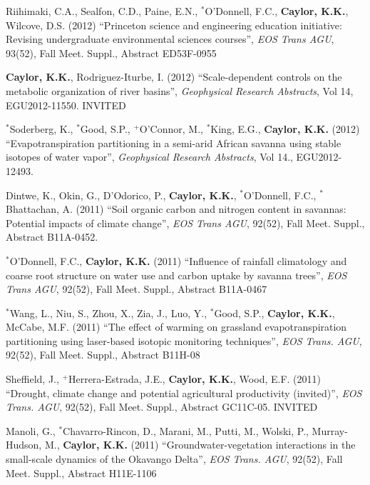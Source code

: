 \documentclass[10pt]{report}
\begin{document}
\begin{etaremune}
\item Riihimaki, C.A., Sealfon, C.D., Paine, E.N., $^{*}$O'Donnell, F.C., \textbf{Caylor, K.K.}, Wilcove, D.S. (2012) ``Princeton science and engineering education initiative: Revising undergraduate environmental sciences courses'', \emph{EOS Trans AGU}, 93(52), Fall Meet. Suppl., Abstract ED53F-0955

\item  \textbf{Caylor, K.K.}, Rodriguez-Iturbe, I. (2012) ``Scale-dependent controls on the metabolic organization of river basins'', \emph{Geophysical Research Abstracts}, Vol 14, EGU2012-11550. INVITED

\item  $^{*}$Soderberg, K., $^{*}$Good, S.P.,  $^{+}$O'Connor, M.,  $^{*}$King, E.G., \textbf{Caylor, K.K.} (2012) ``Evapotranspiration partitioning in a semi-arid African savanna using stable isotopes of water vapor'', \emph{Geophysical Research Abstracts}, Vol 14., EGU2012-12493.

\item Dintwe, K., Okin, G., D'Odorico, P., \textbf{Caylor, K.K.}, $^{*}$O'Donnell, F.C., $^{*}$Bhattachan, A. (2011) ``Soil organic carbon and nitrogen content in savannas: Potential impacts of climate change'', \emph{EOS Trans AGU}, 92(52), Fall Meet. Suppl., Abstract B11A-0452.

\item $^{*}$O'Donnell, F.C., \textbf{Caylor, K.K.} (2011) ``Influence of rainfall climatology and coarse root structure on water use and carbon uptake by savanna trees'', \emph{EOS Trans AGU}, 92(52), Fall Meet. Suppl., Abstract B11A-0467

\item  $^{*}$Wang, L., Niu, S., Zhou, X., Zia, J., Luo, Y.,  $^{*}$Good, S.P., \textbf{Caylor, K.K.}, McCabe, M.F. (2011) ``The effect of warming on grassland evapotranspiration partitioning using laser-based isotopic monitoring techniques'', \emph{EOS Trans. AGU}, 92(52), Fall Meet. Suppl., Abstract B11H-08

\item Sheffield, J., $^{+}$Herrera-Estrada, J.E.,  \textbf{Caylor, K.K.}, Wood, E.F. (2011) ``Drought, climate change and potential agricultural productivity (invited)'', \emph{EOS Trans. AGU}, 92(52), Fall Meet. Suppl., Abstract GC11C-05. INVITED

\item Manoli, G.,  $^{*}$Chavarro-Rincon, D., Marani, M., Putti, M., Wolski, P., Murray-Hudson, M.,  \textbf{Caylor, K.K.} (2011) ``Groundwater-vegetation interactions in the small-scale dynamics of the Okavango Delta'', \emph{EOS Trans. AGU}, 92(52), Fall Meet. Suppl., Abstract H11E-1106


\end{etaremune}
\end{document}
